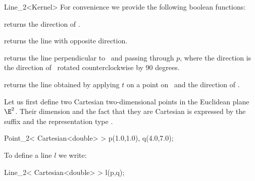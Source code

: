 \begin{ccRefClass} {Line_2<Kernel>}
For convenience we provide the following boolean functions:

       {}
\ccGlue
{}
       {}
\ccGlue
{}
       {}


       {returns the direction of \ccVar.}

       {returns the line with opposite direction.}

        {returns the line perpendicular to \ccVar\ and passing through $p$,
         where the direction is the direction of \ccVar\ rotated 
         counterclockwise by 90 degrees.}

       {returns the line obtained by applying $t$ on a point on \ccVar\ 
        and the direction of \ccVar.}



\ccExample
Let us first define two Cartesian two-dimensional points in the Euclidean 
plane $\E^2$. Their
dimension and the fact that they are Cartesian is expressed by
the suffix  and the representation type .

\begin{cprog}

  Point_2< Cartesian<double> >  p(1.0,1.0), q(4.0,7.0);
\end{cprog} 

To define a line $l$ we write:

\begin{cprog}

  Line_2< Cartesian<double> > l(p,q);
\end{cprog} 

\ccSeeAlso
{} \\

\end{ccRefClass} 
